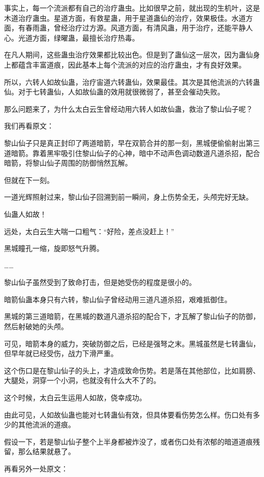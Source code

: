 \begin{this_body}
事实上，每一个流派都有自己的治疗蛊虫。比如很早之前，就出现的生机叶，这是木道治疗蛊虫。星道方面，有救星蛊，用于星道蛊仙的治疗，效果极佳。水道方面，有春雨蛊，曾经治疗过方源。风道方面，有清风蛊，用于治疗，还能平静人心。光道方面，绿曜蛊，最擅长治疗热毒。

在凡人期间，这些蛊虫治疗效果都比较出色。但是到了蛊仙这一层次，因为蛊仙身上都蕴含丰富道痕，因此基本上每个流派的对应的治疗蛊虫，才有良好效果。

所以，六转人如故仙蛊，治疗宙道六转蛊仙，效果最佳。其次是其他流派的六转蛊仙。对于七转蛊仙，人如故仙蛊的效用就很微弱了，甚至会催动失败。

那么问题来了，为什么太白云生曾经动用六转人如故仙蛊，救治了黎山仙子呢？

我们再看原文：

黎山仙子只是真正封印了两道暗箭，早在双箭合并的那一刻，黑城便偷偷射出第三道暗箭。靠着黑牢吸引住黎山仙子的心神，暗中不动声色调动数道凡道杀招，配合暗箭，将黎山仙子周围的防御悄然瓦解。

但就在下一刻。

一道光辉照射过来，黎山仙子回溯到前一瞬间，身上伤势全无，头颅完好无缺。

仙蛊人如故！

远处，太白云生大喘一口粗气：“好险，差点没赶上！”

黑城瞳孔一缩，旋即怒气升腾。

……

黎山仙子虽然受到了致命打击，但是她受伤的程度是很小的。

暗箭仙蛊本身只有六转，黎山仙子曾经动用三道凡道杀招，艰难抵御住。

黑城的第三道暗箭，在黑城的数道凡道杀招的配合下，才瓦解了黎山仙子的防御，然后射破她的头颅。

可见，暗箭本身的威力，突破防御之后，已经是强弩之末。黑城虽然是七转蛊仙，但早年就已经受伤，战力下滑严重。

这个伤口是在黎山仙子的头上，才造成致命伤势。若是落在其他部位，比如肩膀、大腿处，洞穿一个小洞，也就没有什么大不了的。

这个时候，太白云生运用人如故，侥幸成功。

由此可见，人如故仙蛊也能对七转蛊仙有效，但具体要看伤势怎么样。伤口处有多少的其他流派的道痕。

假设一下，若是黎山仙子整个上半身都被炸没了，或者伤口处有浓郁的暗道道痕残留，那么结果就悬了。

再看另外一处原文：


\end{this_body}
